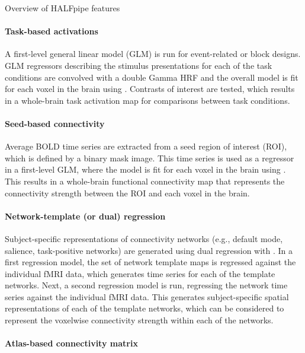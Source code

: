 \begin{featurebox}[label={box:features}]{Overview of HALFpipe features}

\paragraph{Task-based activations}

A first-level general linear model (GLM) is run for event-related or block designs. GLM regressors describing the stimulus presentations for each of the task conditions are convolved with a double Gamma HRF and the overall model is fit for each voxel in the brain using  \parencite{woolrich2001}. Contrasts of interest are tested, which results in a whole-brain task activation map for comparisons between task conditions.

\paragraph{Seed-based connectivity}

Average BOLD time series are extracted from a seed region of interest (ROI), which is defined by a binary mask image. This time series is used as a regressor in a first-level GLM, where the model is fit for each voxel in the brain using . This results in a whole-brain functional connectivity map that represents the connectivity strength between the ROI and each voxel in the brain.

\paragraph{Network-template (or dual) regression}

Subject-specific representations of connectivity networks (e.g., default mode, salience, task-positive networks) are generated using dual regression \parencite{beckmann2009} with . In a first regression model, the set of network template maps is regressed against the individual fMRI data, which generates time series for each of the template networks. Next, a second regression model is run, regressing the network time series against the individual fMRI data. This generates subject-specific spatial representations of each of the template networks, which can be considered to represent the voxelwise connectivity strength within each of the networks.

\paragraph{Atlas-based connectivity matrix}


\end{featurebox}
